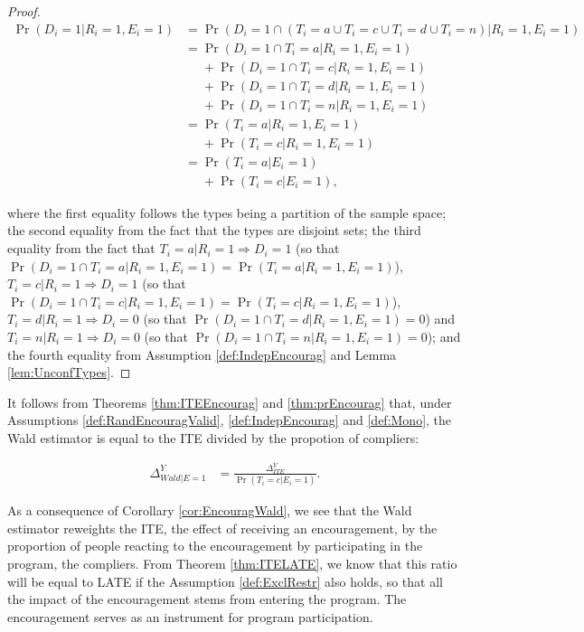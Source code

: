 \documentclass[]{book}
\theoremstyle{definition}
\theoremstyle{definition}
\theoremstyle{definition}
\theoremstyle{remark}
\let\BeginKnitrBlock\begin \let\EndKnitrBlock\end
\begin{document}
\BeginKnitrBlock{proof}
\iffalse{} {Proof. } \fi{}\begin{align*}
 \Pr(D_i=1|R_i=1,E_i=1) & =\Pr(D_i=1\cap (T_i=a\cup T_i=c\cup T_i=d\cup T_i=n)|R_i=1,E_i=1) \\
                        & = \Pr(D_i=1\cap T_i=a|R_i=1,E_i=1)\\
                        & \phantom{=}+ \Pr(D_i=1\cap T_i=c|R_i=1,E_i=1)\\
                        & \phantom{=} +\Pr(D_i=1\cap T_i=d|R_i=1,E_i=1)\\
                        & \phantom{=} +\Pr(D_i=1\cap T_i=n|R_i=1,E_i=1)\\
                        & = \Pr(T_i=a|R_i=1,E_i=1)\\
                        & \phantom{=} +\Pr(T_i=c|R_i=1,E_i=1)\\
                        & = \Pr(T_i=a|E_i=1)\\
                        & \phantom{=} +\Pr(T_i=c|E_i=1),
\end{align*}

where the first equality follows the types being a partition of the sample space; the second equality from the fact that the types are disjoint sets; the third equality from the fact that \(T_i=a|R_i=1 \Rightarrow D_i=1\) (so that \(\Pr(D_i=1\cap T_i=a|R_i=1,E_i=1)=\Pr(T_i=a|R_i=1,E_i=1)\)), \(T_i=c|R_i=1 \Rightarrow D_i=1\) (so that \(\Pr(D_i=1\cap T_i=c|R_i=1,E_i=1)=\Pr(T_i=c|R_i=1,E_i=1)\)), \(T_i=d|R_i=1 \Rightarrow D_i=0\) (so that \(\Pr(D_i=1\cap T_i=d|R_i=1,E_i=1)=0\)) and \(T_i=n|R_i=1 \Rightarrow D_i=0\) (so that \(\Pr(D_i=1\cap T_i=n|R_i=1,E_i=1)=0\)); and the fourth equality from Assumption \ref{def:IndepEncourag} and Lemma \ref{lem:UnconfTypes}.
\EndKnitrBlock{proof}

\BeginKnitrBlock{corollary}[Wald estimator and ITE]
\protect\hypertarget{cor:EncouragWald}{}{\label{cor:EncouragWald} \iffalse (Wald estimator and ITE) \fi{} }It follows from Theorems \ref{thm:ITEEncourag} and \ref{thm:prEncourag} that, under Assumptions \ref{def:RandEncouragValid}, \ref{def:IndepEncourag} and \ref{def:Mono}, the Wald estimator is equal to the ITE divided by the propotion of compliers:

\begin{align*}
  \Delta^Y_{Wald|E=1} & = \frac{\Delta^Y_{ITE}}{\Pr(T_i=c|E_i=1)}.
\end{align*}
\EndKnitrBlock{corollary}

As a consequence of Corollary \ref{cor:EncouragWald}, we see that the Wald estimator reweights the ITE, the effect of receiving an encouragement, by the proportion of people reacting to the encouragement by participating in the program, the compliers.
From Theorem \ref{thm:ITELATE}, we know that this ratio will be equal to LATE if the Assumption \ref{def:ExclRestr} also holds, so that all the impact of the encouragement stems from entering the program.
The encouragement serves as an instrument for program participation.
\end{document}
